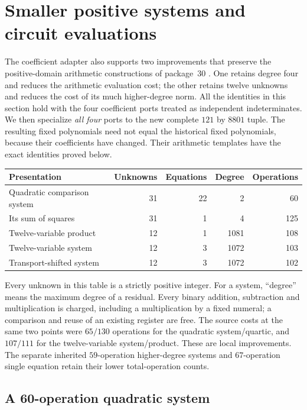 \section{Smaller positive systems and circuit evaluations}
\label{sec:low-degree}

The coefficient adapter also supports two improvements that preserve the
positive-domain arithmetic constructions of package~30 \cite{repo30}.  One
retains degree four and reduces the arithmetic evaluation cost; the other
retains twelve unknowns and reduces the cost of its much higher-degree norm.
All the identities in this section hold with the four coefficient ports
treated as independent indeterminates.  We then specialize \emph{all four}
ports to the new complete $121$ by $8801$ tuple.  The resulting fixed
polynomials need not equal the historical fixed polynomials, because their
coefficients have changed.  Their arithmetic templates have the exact
identities proved below.

\begin{center}
\begin{tabular}{lrrrr}
\hline
Presentation & Unknowns & Equations & Degree & Operations\\
\hline
Quadratic comparison system &31&22&2&60\\
Its sum of squares &31&1&4&125\\
Twelve-variable product &12&1&1081&108\\
Twelve-variable system &12&3&1072&103\\
Transport-shifted system &12&3&1072&102\\
\hline
\end{tabular}
\end{center}

Every unknown in this table is a strictly positive integer.  For a system,
``degree'' means the maximum degree of a residual.  Every binary addition,
subtraction and multiplication is charged, including a multiplication by a
fixed numeral; a comparison and reuse of an existing register are free.
The source costs at the same two points were $65/130$ operations for the
quadratic system/quartic, and $107/111$ for the twelve-variable
system/product.  These are local improvements.  The separate inherited
$59$-operation higher-degree systems and $67$-operation single equation
retain their lower total-operation counts.

\subsection{A 60-operation quadratic system}


